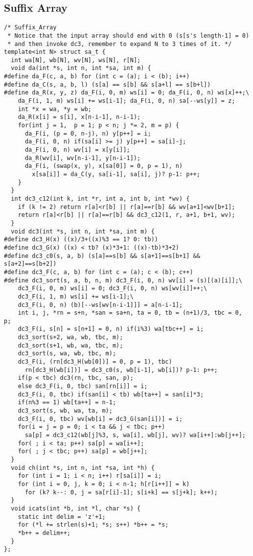 \subsection{Suffix Array}
\begin{lstlisting}
/* Suffix_Array
 * Notice that the input array should end with 0 (s[s's length-1] = 0)
 * and then invoke dc3, remember to expand N to 3 times of it. */
template<int N> struct sa_t {
  int wa[N], wb[N], wv[N], ws[N], r[N];
  void da(int *s, int n, int *sa, int m) {
#define da_F(c, a, b) for (int c = (a); i < (b); i++)
#define da_C(s, a, b, l) (s[a] == s[b] && s[a+l] == s[b+l])
#define da_R(x, y, z) da_F(i, 0, m) ws[i] = 0; da_F(i, 0, n) ws[x]++;\
    da_F(i, 1, m) ws[i] += ws[i-1]; da_F(i, 0, n) sa[--ws[y]] = z;
    int *x = wa, *y = wb;
    da_R(x[i] = s[i], x[n-i-1], n-i-1);
    for(int j = 1,  p = 1; p < n; j *= 2, m = p) {
      da_F(i, (p = 0, n-j), n) y[p++] = i;
      da_F(i, 0, n) if(sa[i] >= j) y[p++] = sa[i]-j;
      da_F(i, 0, n) wv[i] = x[y[i]];
      da_R(wv[i], wv[n-i-1], y[n-i-1]);
      da_F(i, (swap(x, y), x[sa[0]] = 0, p = 1), n)
        x[sa[i]] = da_C(y, sa[i-1], sa[i], j)? p-1: p++;
    }
  }
  int dc3_c12(int k, int *r, int a, int b, int *wv) {
    if (k != 2) return r[a]<r[b] || r[a]==r[b] && wv[a+1]<wv[b+1];
    return r[a]<r[b] || r[a]==r[b] && dc3_c12(1, r, a+1, b+1, wv);
  }
  void dc3(int *s, int n, int *sa, int m) {
#define dc3_H(x) ((x)/3+((x)%3 == 1? 0: tb))
#define dc3_G(x) ((x) < tb? (x)*3+1: ((x)-tb)*3+2)
#define dc3_c0(s, a, b) (s[a]==s[b] && s[a+1]==s[b+1] && s[a+2]==s[b+2])
#define dc3_F(c, a, b) for (int c = (a); c < (b); c++)
#define dc3_sort(s, a, b, n, m) dc3_F(i, 0, n) wv[i] = (s)[(a)[i]];\
    dc3_F(i, 0, m) ws[i] = 0; dc3_F(i, 0, n) ws[wv[i]]++;\
    dc3_F(i, 1, m) ws[i] += ws[i-1];\
    dc3_F(i, 0, n) (b)[--ws[wv[n-i-1]]] = a[n-i-1];
    int i, j, *rn = s+n, *san = sa+n, ta = 0, tb = (n+1)/3, tbc = 0, p;
    dc3_F(i, s[n] = s[n+1] = 0, n) if(i%3) wa[tbc++] = i;
    dc3_sort(s+2, wa, wb, tbc, m);
    dc3_sort(s+1, wb, wa, tbc, m);
    dc3_sort(s, wa, wb, tbc, m);
    dc3_F(i, (rn[dc3_H(wb[0])] = 0, p = 1), tbc)
      rn[dc3_H(wb[i])] = dc3_c0(s, wb[i-1], wb[i])? p-1: p++;
    if(p < tbc) dc3(rn, tbc, san, p);
    else dc3_F(i, 0, tbc) san[rn[i]] = i;
    dc3_F(i, 0, tbc) if(san[i] < tb) wb[ta++] = san[i]*3;
    if(n%3 == 1) wb[ta++] = n-1;
    dc3_sort(s, wb, wa, ta, m);
    dc3_F(i, 0, tbc) wv[wb[i] = dc3_G(san[i])] = i;
    for(i = j = p = 0; i < ta && j < tbc; p++)
      sa[p] = dc3_c12(wb[j]%3, s, wa[i], wb[j], wv)? wa[i++]:wb[j++];
    for( ; i < ta; p++) sa[p] = wa[i++];
    for( ; j < tbc; p++) sa[p] = wb[j++];
  }
  void ch(int *s, int n, int *sa, int *h) {
    for (int i = 1; i < n; i++) r[sa[i]] = i;
    for (int i = 0, j, k = 0; i < n-1; h[r[i++]] = k)
      for (k? k--: 0, j = sa[r[i]-1]; s[i+k] == s[j+k]; k++);
  }
  void icats(int *b, int *l, char *s) {
    static int delim = 'z'+1;
    for (*l += strlen(s)+1; *s; s++) *b++ = *s;
    *b++ = delim++;
  }
};
\end{lstlisting}


